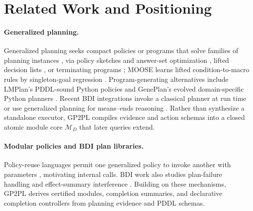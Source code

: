 \section{Related Work and Positioning}
\label{sec:related-work}

\paragraph{Generalized planning.}
Generalized planning seeks compact policies or programs that solve families of
planning instances
\cite{Jimenez2019ReviewGeneralizedPlanning,Srivastava2011DirectedSearch,
Bonet2018Features,Frances2021LearningGeneralPolicies,
Bonet2024GeneralPoliciesWidth}, via policy sketches and answer-set optimization
\cite{Drexler2022LearningSketches,Drexler2024SubgoalSketches}, lifted decision
lists \cite{Yang2022PG3}, or terminating programs
\cite{SegoviaAguas2022BFGPpp}; MOOSE learns lifted condition-to-macro rules by
singleton-goal regression \cite{Chen2026Moose}. Program-generating alternatives
include LMPlan's PDDL-sound Python policies \cite{Chen2025LMPlan} and GenePlan's
evolved domain-specific Python planners \cite{Murray2026GenePlan}. Recent BDI
integrations invoke a classical planner at run time
\cite{Xu2024OperationalSemantics} or use generalized planning for means--ends
reasoning \cite{Meneguzzi2025GeneralisedBDIPlanning}. Rather than synthesize a
standalone executor, GP2PL compiles evidence and action schemas into a closed
atomic module core $\mathcal M_D$ that later queries extend.

\paragraph{Modular policies and BDI plan libraries.}
Policy-reuse languages permit one generalized policy to invoke another with
parameters \cite{Bonet2024PolicyReuse}, motivating internal calls. BDI work also
studies plan-failure handling
\cite{Sardina2007PlanFailure} and effect-summary interference
\cite{Thangarajah2003GoalInterference}. Building on these mechanisms, GP2PL
derives certified modules, completion summaries, and declarative completion
controllers from planning evidence and PDDL schemas.


